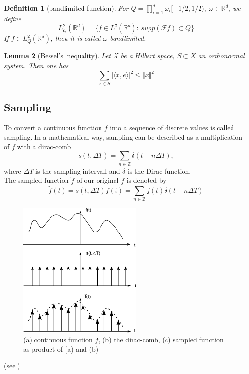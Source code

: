 \documentclass[a4paper, 11pt]{scrreprt}
\newtheorem{defi}{Definition}[section]
\newtheorem{lemma}[defi]{Lemma}
\newcommand{\RR}{\mathbb{R}}
\newcommand{\ZZ}{\mathbb{Z}}
\newcommand{\FF}{\mathcal{F}}
\begin{document}
\begin{defi}[bandlimited function]
	For \(Q = \prod_{i=1}^d \omega_i[-1/2, 1/2),\ \omega\in\RR^d\), we define
	\begin{equation}
		L_Q^2(\RR^d) = \{f\in L^2(\RR^d):\ supp(\FF f) \subset Q\}
	\end{equation}
	If \(f\in L_Q^2(\RR^d)\), then it is called \(\omega\)-bandlimited.
\end{defi}

\begin{lemma}[Bessel's inequality]
Let X be a Hilbert space, $S \subset X$ an orthonormal system. Then one has
\[\sum_{e \in S} |\langle x, e \rangle |^2 \leq \Vert x \Vert ^2\]
\end{lemma}


\subsection{Sampling}
To convert a continuous function \(f\) into a sequence of discrete values is called sampling. In a mathematical way, sampling can be described as a multiplication of \(f\) with a dirac-comb 
\[s(t,\Delta T) = \sum_{n\in\ZZ} \delta(t-n\Delta T), \]
where \(\Delta T\) is the sampling intervall and \(\delta\) is the Dirac-function.\\
The sampled function \(\tilde{f}\) of our original \(f\) is denoted by
\begin{equation}
	\tilde{f} (t) = s(t,\Delta T) f(t) = \sum_{n\in\ZZ} f(t)\delta(t-n\Delta T)
\end{equation}
\begin{figure}[htpb]
	\centering
	\includegraphics[width=0.55\textwidth]{Sampling-Visualisierung.pdf}
	\caption{(a) continuous function \(f\), (b) the dirac-comb, (c) sampled function as product of (a) and (b)}
\end{figure}
(see \cite{marks02})\\
\end{document}
